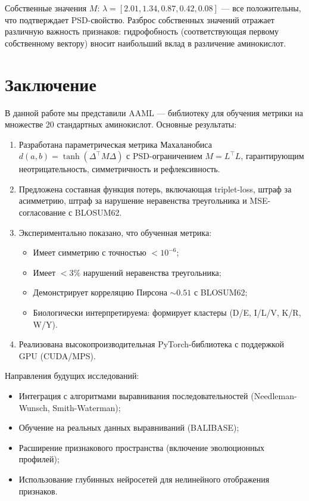 \documentclass[12pt]{article}
\begin{document}
Собственные значения $M$: $\lambda = [2.01, 1.34, 0.87, 0.42, 0.08]$ --- все положительны, что подтверждает PSD-свойство. Разброс собственных значений отражает различную важность признаков: гидрофобность (соответствующая первому собственному вектору) вносит наибольший вклад в различение аминокислот.

\section{Заключение}

В данной работе мы представили AAML --- библиотеку для обучения метрики на множестве 20 стандартных аминокислот. Основные результаты:

\begin{enumerate}
    \item Разработана параметрическая метрика Махаланобиса $d(a,b) = \tanh(\Delta^{\top} M \Delta)$ с PSD-ограничением $M = L^{\top}L$, гарантирующим неотрицательность, симметричность и рефлексивность.
    \item Предложена составная функция потерь, включающая triplet-loss, штраф за асимметрию, штраф за нарушение неравенства треугольника и MSE-согласование с BLOSUM62.
    \item Экспериментально показано, что обученная метрика:
    \begin{itemize}
        \item Имеет симметрию с точностью $< 10^{-6}$;
        \item Имеет $< 3\%$ нарушений неравенства треугольника;
        \item Демонстрирует корреляцию Пирсона $\sim 0.51$ с BLOSUM62;
        \item Биологически интерпретируема: формирует кластеры (D/E, I/L/V, K/R, W/Y).
    \end{itemize}
    \item Реализована высокопроизводительная PyTorch-библиотека с поддержкой GPU (CUDA/MPS).
\end{enumerate}

Направления будущих исследований:
\begin{itemize}
    \item Интеграция с алгоритмами выравнивания последовательностей (Needleman-Wunsch, Smith-Waterman);
    \item Обучение на реальных данных выравниваний (BALIBASE);
    \item Расширение признакового пространства (включение эволюционных профилей);
    \item Использование глубинных нейросетей для нелинейного отображения признаков.
\end{itemize}
\end{document}
